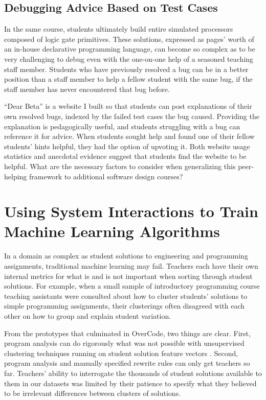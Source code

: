 \documentclass{sigchi}
\begin{document}
\subsection{Debugging Advice Based on Test Cases} In the same course, students ultimately build entire simulated processors composed of logic gate primitives. These solutions, expressed as pages' worth of an in-house declarative programming language, can become so complex as to be very challenging to debug even with the one-on-one help of a seasoned teaching staff member. Students who have previously resolved a bug can be in a better position than a staff member to help a fellow student with the same bug, if the staff member has never encountered that bug before.

``Dear Beta'' is a website I built so that students can post explanations of their own resolved bugs, indexed by the failed test cases the bug caused. Providing the explanation is pedagogically useful, and students struggling with a bug can reference it for advice. When students sought help and found one of their fellow students' hints helpful, they had the option of upvoting it. Both website usage statistics and anecdotal evidence suggest that students find the website to be helpful. What are the necessary factors to consider when generalizing this peer-helping framework to additional software design courses?

\section{Using System Interactions to Train Machine Learning Algorithms}

In a domain as complex as student solutions to engineering and programming assignments, traditional machine learning may fail. Teachers each have their own internal metrics for what is and is not important when sorting through student solutions. For example, when a small sample of introductory programming course teaching assistants were consulted about how to cluster students' solutions to simple programming assignments, their clusterings often disagreed with each other on how to group and explain student variation.

From the prototypes that culminated in OverCode, two things are clear. First, program analysis can do rigorously what was not possible with unsupervised clustering techniques running on student solution feature vectors \cite{GlassmanCHIWkshop}. Second, program analysis and manually specified rewrite rules can only get teachers so far. Teachers' ability to interrogate the thousands of student solutions available to them in our datasets was limited by their patience to specify what they believed to be irrelevant differences between clusters of solutions.
\end{document}
